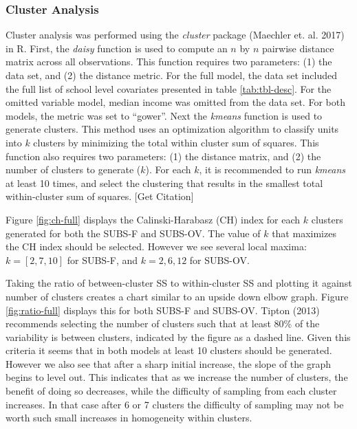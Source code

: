 \documentclass[man]{apa6}
\theoremstyle{definition}
\theoremstyle{definition}
\theoremstyle{definition}
\theoremstyle{remark}
\begin{document}
\subsubsection{Cluster Analysis}\label{cluster-analysis-1}

Cluster analysis was performed using the \emph{cluster} package
(Maechler et. al. 2017) in R. First, the \emph{daisy} function is used
to compute an \(n\) by \(n\) pairwise distance matrix across all
observations. This function requires two parameters: (1) the data set,
and (2) the distance metric. For the full model, the data set included
the full list of school level covariates presented in table
\ref{tab:tbl-desc}. For the omitted variable model, median income was
omitted from the data set. For both models, the metric was set to
\enquote{gower}. Next the \emph{kmeans} function is used to generate
clusters. This method uses an optimization algorithm to classify units
into \(k\) clusters by minimizing the total within cluster sum of
squares. This function also requires two parameters: (1) the distance
matrix, and (2) the number of clusters to generate (\(k\)). For each
\(k\), it is recommended to run \emph{kmeans} at least 10 times, and
select the clustering that results in the smallest total within-cluster
sum of squares. {[}Get Citation{]}

Figure \ref{fig:ch-full} displays the Calinski-Harabasz (CH) index for
each \(k\) clusters generated for both the SUBS-F and SUBS-OV. The value
of \(k\) that maximizes the CH index should be selected. However we see
several local maxima: \(k = [2, 7, 10]\) for SUBS-F, and
\(k = 2, 6, 12\) for SUBS-OV.

Taking the ratio of between-cluster SS to within-cluster SS and plotting
it against number of clusters creates a chart similar to an upside down
elbow graph. Figure \ref{fig:ratio-full} displays this for both SUBS-F
and SUBS-OV. Tipton (2013) recommends selecting the number of clusters
such that at least 80\% of the variability is between clusters,
indicated by the figure as a dashed line. Given this criteria it seems
that in both models at least 10 clusters should be generated. However we
also see that after a sharp initial increase, the slope of the graph
begins to level out. This indicates that as we increase the number of
clusters, the benefit of doing so decreases, while the difficulty of
sampling from each cluster increases. In that case after 6 or 7 clusters
the difficulty of sampling may not be worth such small increases in
homogeneity within clusters.
\end{document}
